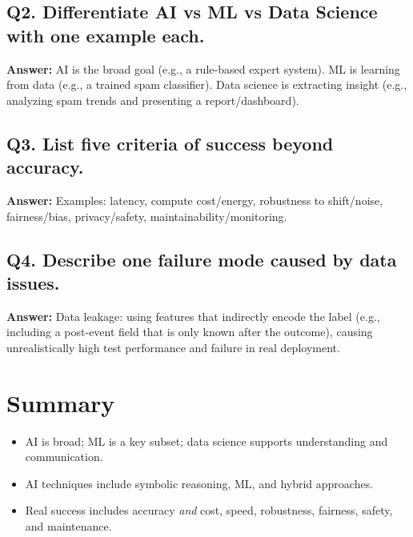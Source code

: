 \documentclass[11pt]{article}
\begin{document}
\subsection*{Q2. Differentiate AI vs ML vs Data Science with one example each.}
\textbf{Answer:} AI is the broad goal (e.g., a rule-based expert system). ML is learning from data (e.g., a trained spam classifier). Data science is extracting insight (e.g., analyzing spam trends and presenting a report/dashboard).

\subsection*{Q3. List five criteria of success beyond accuracy.}
\textbf{Answer:} Examples: latency, compute cost/energy, robustness to shift/noise, fairness/bias, privacy/safety, maintainability/monitoring.

\subsection*{Q4. Describe one failure mode caused by data issues.}
\textbf{Answer:} Data leakage: using features that indirectly encode the label (e.g., including a post-event field that is only known after the outcome), causing unrealistically high test performance and failure in real deployment.

\section{Summary}
\begin{itemize}[leftmargin=*]
  \item AI is broad; ML is a key subset; data science supports understanding and communication.
  \item AI techniques include symbolic reasoning, ML, and hybrid approaches.
  \item Real success includes accuracy \emph{and} cost, speed, robustness, fairness, safety, and maintenance.
\end{itemize}
\notesources{\AIMLUnitISources}
\end{document}
